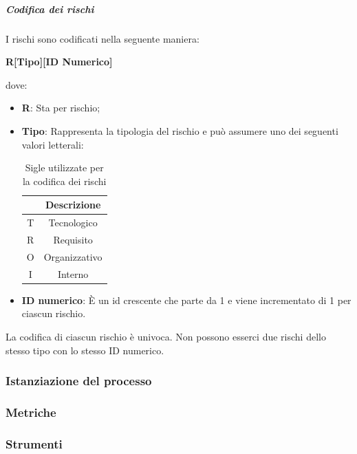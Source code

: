 \subparagraph {Codifica dei rischi}
I rischi sono codificati nella seguente maniera: \\
\begin{center}
  \textbf{\Large{R[Tipo][ID Numerico]}}
\end{center}
dove:
\begin{itemize}[label={}]
  \item \textbf{R}: Sta per rischio;
  \item \textbf{Tipo}: Rappresenta la tipologia del rischio e può assumere uno dei seguenti valori letterali:
        \begin{table}[H]
          \centering
          \renewcommand{\arraystretch}{1.8}
          \begin{tabular}{c|c}
            \rowcolor[HTML]{125E28}
            \multicolumn{1}{c}{\color[HTML]{FFFFFF}\textbf{Sigla}}
              & \multicolumn{1}{c}{\color[HTML]{FFFFFF}\textbf{Descrizione}} \\
            \hline
            T & Tecnologico                                                  \\
            R & Requisito                                                    \\
            O & Organizzativo                                                \\
            I & Interno                                                      \\
          \end{tabular}
          \caption{Sigle utilizzate per la codifica dei rischi}
        \end{table}
  \item \textbf{ID numerico}: È un id crescente che parte da 1 e viene incrementato di 1 per ciascun rischio.\\
\end{itemize}
La codifica di ciascun rischio è univoca. Non possono esserci due rischi dello stesso tipo con lo stesso ID numerico.
\subsubsection{Istanziazione del processo}
\subsubsection{Metriche}
\subsubsection{Strumenti}
\vspace{2cm}

